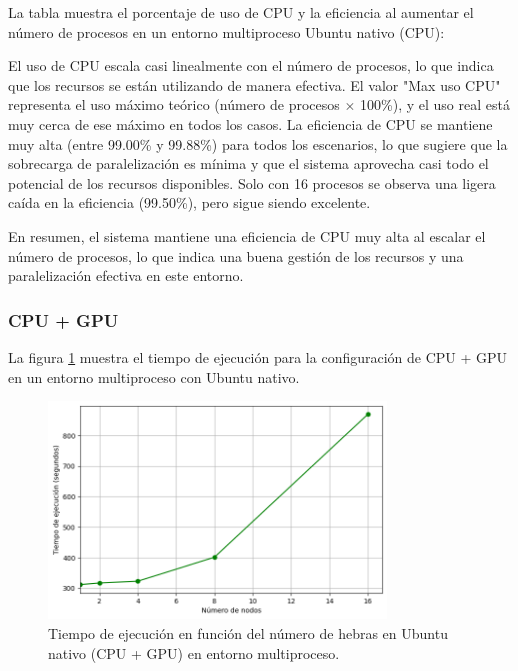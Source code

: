 La tabla muestra el porcentaje de uso de CPU y la eficiencia al aumentar el número de procesos en un entorno multiproceso Ubuntu nativo (CPU):

El uso de CPU escala casi linealmente con el número de procesos, lo que indica que los recursos se están utilizando de manera efectiva. El valor "Max uso CPU" representa el uso máximo teórico (número de procesos $\times$ 100\%), y el uso real está muy cerca de ese máximo en todos los casos. La eficiencia de CPU se mantiene muy alta (entre 99.00\% y 99.88\%) para todos los escenarios, lo que sugiere que la sobrecarga de paralelización es mínima y que el sistema aprovecha casi todo el potencial de los recursos disponibles. Solo con 16 procesos se observa una ligera caída en la eficiencia (99.50\%), pero sigue siendo excelente.

En resumen, el sistema mantiene una eficiencia de CPU muy alta al escalar el número de procesos, lo que indica una buena gestión de los recursos y una paralelización efectiva en este entorno.

\subsubsection{CPU + GPU}

La figura \ref{fig:multi-node_ubuntu_gpu_native_time} muestra el tiempo de ejecución para la configuración de CPU + GPU en un entorno multiproceso con Ubuntu nativo.

\begin{figure}[H]
    \centering
    \includegraphics[width=0.8\textwidth]{imagenes/cap5/multi-node_ubuntu_gpu_native_time.png}
    \caption{Tiempo de ejecución en función del número de hebras en Ubuntu nativo (CPU + GPU) en entorno multiproceso.}
    \label{fig:multi-node_ubuntu_gpu_native_time}
\end{figure}

